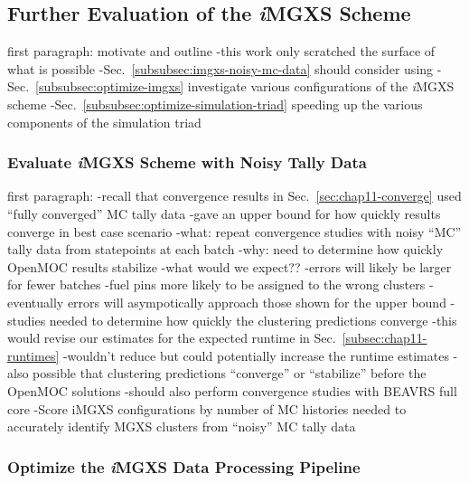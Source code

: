 \subsection{Further Evaluation of the \textit{i}MGXS Scheme}
\label{subsec:chap12-further-imgxs}

first paragraph: motivate and outline
-this work only scratched the surface of what is possible
-Sec.~\ref{subsubsec:imgxs-noisy-mc-data} should consider using 
-Sec.~\ref{subsubsec:optimize-imgxs} investigate various configurations of the \textit{i}MGXS scheme
-Sec.~\ref{subsubsec:optimize-simulation-triad} speeding up the various components of the simulation triad

\subsubsection{Evaluate \textit{i}MGXS Scheme with Noisy Tally Data}
\label{subsubsec:chap12-imgxs-noisy-mc-data}

first paragraph: 
-recall that convergence results in Sec.~\ref{sec:chap11-converge} used ``fully converged'' MC tally data
  -gave an upper bound for how quickly results converge in best case scenario
-what: repeat convergence studies with noisy ``MC'' tally data from statepoints at each batch
-why:  need to determine how quickly OpenMOC results stabilize 
-what would we expect??
  -errors will likely be larger for fewer batches
    -fuel pins more likely to be assigned to the wrong clusters
  -eventually errors will asympotically approach those shown for the upper bound
  -studies needed to determine how quickly the clustering predictions converge
-this would revise our estimates for the expected runtime in Sec.~\ref{subsec:chap11-runtimes}
  -wouldn't reduce but could potentially increase the runtime estimates
  -also possible that clustering predictions ``converge'' or ``stabilize'' before the OpenMOC solutions
-should also perform convergence studies with BEAVRS full core
-Score iMGXS configurations by number of MC histories needed to accurately identify MGXS clusters from ``noisy'' MC tally data

\subsubsection{Optimize the \textit{i}MGXS Data Processing Pipeline}
\label{subsubsec:chap12-optimize-imgxs}

